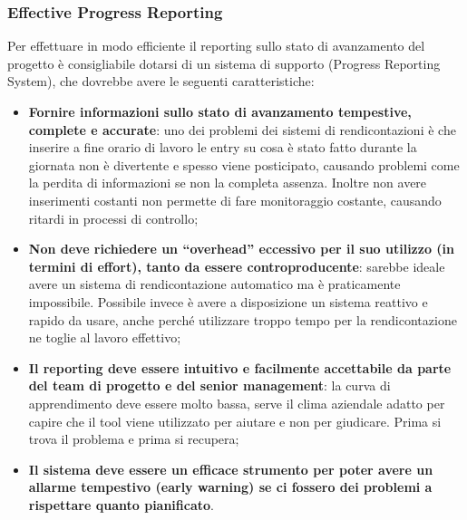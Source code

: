 \subsubsection{Effective Progress Reporting}
Per effettuare in modo efficiente il reporting sullo stato di avanzamento del progetto è consigliabile dotarsi di un sistema di supporto (Progress Reporting System), che dovrebbe avere le seguenti caratteristiche:
\begin{itemize}
	\item \textbf{Fornire informazioni sullo stato di avanzamento tempestive, complete e accurate}: uno dei problemi dei sistemi di rendicontazioni è che inserire a fine orario di lavoro le entry su cosa è stato fatto durante la giornata non è divertente e spesso viene posticipato, causando problemi come la perdita di informazioni se non la completa assenza. Inoltre non avere inserimenti costanti non permette di fare monitoraggio costante, causando ritardi in processi di controllo;
	\item \textbf{Non deve richiedere un “overhead” eccessivo per il suo utilizzo (in termini di effort), tanto da essere controproducente}: sarebbe ideale avere un sistema di rendicontazione automatico ma è praticamente impossibile. Possibile invece è avere a disposizione un sistema reattivo e rapido da usare, anche perché utilizzare troppo tempo per la rendicontazione ne toglie al lavoro effettivo;
	\item \textbf{Il reporting deve essere intuitivo e facilmente accettabile da parte del team di progetto e del senior management}: la curva di apprendimento deve essere molto bassa, serve il clima aziendale adatto per capire che il tool viene utilizzato per aiutare e non per giudicare. Prima si trova il problema e prima si recupera;
	\item \textbf{Il sistema deve essere un efficace strumento per poter avere un allarme tempestivo (early warning) se ci fossero dei problemi a rispettare quanto pianificato}.
\end{itemize}
